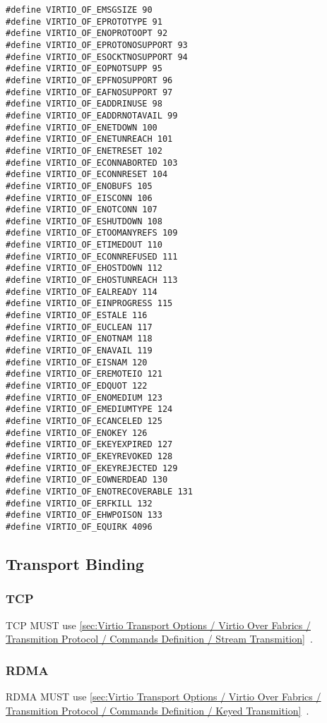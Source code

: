 \begin{lstlisting}
#define VIRTIO_OF_EMSGSIZE 90
#define VIRTIO_OF_EPROTOTYPE 91
#define VIRTIO_OF_ENOPROTOOPT 92
#define VIRTIO_OF_EPROTONOSUPPORT 93
#define VIRTIO_OF_ESOCKTNOSUPPORT 94
#define VIRTIO_OF_EOPNOTSUPP 95
#define VIRTIO_OF_EPFNOSUPPORT 96
#define VIRTIO_OF_EAFNOSUPPORT 97
#define VIRTIO_OF_EADDRINUSE 98
#define VIRTIO_OF_EADDRNOTAVAIL 99
#define VIRTIO_OF_ENETDOWN 100
#define VIRTIO_OF_ENETUNREACH 101
#define VIRTIO_OF_ENETRESET 102
#define VIRTIO_OF_ECONNABORTED 103
#define VIRTIO_OF_ECONNRESET 104
#define VIRTIO_OF_ENOBUFS 105
#define VIRTIO_OF_EISCONN 106
#define VIRTIO_OF_ENOTCONN 107
#define VIRTIO_OF_ESHUTDOWN 108
#define VIRTIO_OF_ETOOMANYREFS 109
#define VIRTIO_OF_ETIMEDOUT 110
#define VIRTIO_OF_ECONNREFUSED 111
#define VIRTIO_OF_EHOSTDOWN 112
#define VIRTIO_OF_EHOSTUNREACH 113
#define VIRTIO_OF_EALREADY 114
#define VIRTIO_OF_EINPROGRESS 115
#define VIRTIO_OF_ESTALE 116
#define VIRTIO_OF_EUCLEAN 117
#define VIRTIO_OF_ENOTNAM 118
#define VIRTIO_OF_ENAVAIL 119
#define VIRTIO_OF_EISNAM 120
#define VIRTIO_OF_EREMOTEIO 121
#define VIRTIO_OF_EDQUOT 122
#define VIRTIO_OF_ENOMEDIUM 123
#define VIRTIO_OF_EMEDIUMTYPE 124
#define VIRTIO_OF_ECANCELED 125
#define VIRTIO_OF_ENOKEY 126
#define VIRTIO_OF_EKEYEXPIRED 127
#define VIRTIO_OF_EKEYREVOKED 128
#define VIRTIO_OF_EKEYREJECTED 129
#define VIRTIO_OF_EOWNERDEAD 130
#define VIRTIO_OF_ENOTRECOVERABLE 131
#define VIRTIO_OF_ERFKILL 132
#define VIRTIO_OF_EHWPOISON 133
#define VIRTIO_OF_EQUIRK 4096
\end{lstlisting}

\subsection{Transport Binding}\label{sec:Virtio Transport Options / Virtio Over Fabrics / Transport Binding}
\subsubsection{TCP}\label{sec:Virtio Transport Options / Virtio Over Fabrics / ransport Binding / TCP}
TCP MUST use \ref{sec:Virtio Transport Options / Virtio Over Fabrics / Transmition Protocol / Commands Definition / Stream Transmition}~.

\subsubsection{RDMA}\label{sec:Virtio Transport Options / Virtio Over Fabrics / ransport Binding / RDMA}
RDMA MUST use \ref{sec:Virtio Transport Options / Virtio Over Fabrics / Transmition Protocol / Commands Definition / Keyed Transmition}~.

